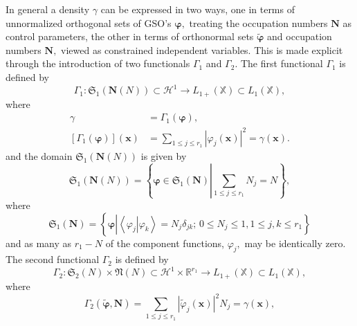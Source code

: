 \documentclass[aps,preprint]{revtex4}%
\begin{document}
In general a density $\gamma$ can be expressed in two ways, one in terms of
unnormalized orthogonal sets of GSO's $\boldsymbol{\varphi,}$ treating the
occupation numbers $\boldsymbol{N}$ as control parameters, the other in terms
of orthonormal sets $\boldsymbol{\tilde{\varphi}}$ and occupation numbers
$\boldsymbol{N,}$ viewed as constrained independent variables. This is made
explicit through the introduction of two functionals $\Gamma_{1}$ and
$\Gamma_{2}.$ The first functional $\Gamma_{1}$ is defined by
\begin{equation}
\Gamma_{1}:\mathfrak{S}_{1}\left(  \boldsymbol{N}\left(  N\right)  \right)
\subset\mathcal{H}^{1}\rightarrow L_{1+}\left(  \mathbb{X}\right)  \subset
L_{1}\left(  \mathbb{X}\right)  ,
\end{equation}
where%
\begin{align}
\gamma &  =\Gamma_{1}\left(  \boldsymbol{\varphi}\right)  ,\nonumber\\
\left[  \Gamma_{1}\left(  \boldsymbol{\varphi}\right)  \right]  \left(
\boldsymbol{x}\right)   &  =\sum_{1\leq j\leq r_{1}}\left\vert \varphi
_{j}\left(  \boldsymbol{x}\right)  \right\vert ^{2}=\gamma\left(
\boldsymbol{x}\right)  . \label{Gamma}%
\end{align}
and the domain $\mathfrak{S}_{1}\left(  \boldsymbol{N}\left(  N\right)
\right)  $ is given by
\begin{equation}
\mathfrak{S}_{1}\left(  \boldsymbol{N}\left(  N\right)  \right)  =\left\{
\boldsymbol{\varphi\in}\mathfrak{S}_{1}\left(  \boldsymbol{N}\right)
\left\vert \sum_{1\leq j\leq r_{1}}N_{j}=N\right.  \right\}  ,
\end{equation}
where
\begin{equation}
\mathfrak{S}_{1}\left(  \boldsymbol{N}\right)  =\left\{  \boldsymbol{\varphi
}\left\vert \left\langle \left.  \varphi_{j}\right\vert \varphi_{k}%
\right\rangle =N_{j}\delta_{jk};\,0\leq N_{j}\leq1,1\leq j,k\leq r_{1}\right.
\right\}
\end{equation}
and as many as $r_{1}-N$ of the component functions, $\varphi_{j},$ may be
identically zero. The second functional $\Gamma_{2}$ is defined by
\begin{equation}
\Gamma_{2}:\mathfrak{S}_{2}\left(  N\right)  \times\mathfrak{N}\left(
N\right)  \subset\mathcal{H}^{1}\times\mathbb{R}^{r_{1}}\rightarrow
L_{1+}\left(  \mathbb{X}\right)  \subset L_{1}\left(  \mathbb{X}\right)  ,
\end{equation}
where
\begin{equation}
\Gamma_{2}\left(  \boldsymbol{\tilde{\varphi},N}\right)  =\sum_{1\leq j\leq
r_{1}}\left\vert \tilde{\varphi}_{j}\left(  \boldsymbol{x}\right)  \right\vert
^{2}N_{j}=\gamma\left(  \boldsymbol{x}\right)  , \label{GammaN}%
\end{equation}
\end{document}
